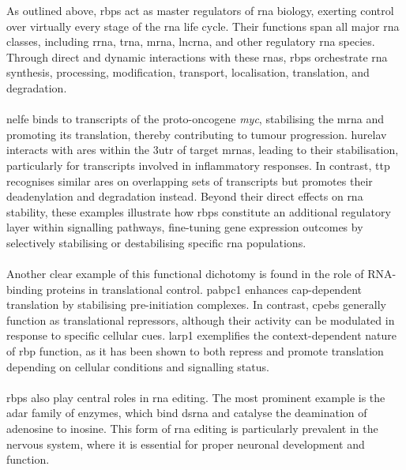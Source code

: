 As outlined above, \glspl{rbp} act as master regulators of \gls{rna} biology, exerting control over virtually every stage of the \gls{rna} life cycle. Their functions span all major \gls{rna} classes, including \gls{rrna}, \gls{trna}, \gls{mrna}, \gls{lncrna}, and other regulatory \gls{rna} species\cite{gerstberger_census_2014, kelaini_rna-binding_2021}. Through direct and dynamic interactions with these \glspl{rna}, \glspl{rbp} orchestrate \gls{rna} synthesis, processing, modification, transport, localisation, translation, and degradation\cite{gerstberger_census_2014, kelaini_rna-binding_2021}.  
\\
\\
\Gls{nelfe} binds to transcripts of the proto-oncogene \textit{\gls{myc}}, stabilising the \gls{mrna} and promoting its translation, thereby contributing to tumour progression\cite{kelaini_rna-binding_2021}. \gls{hurelav} interacts with \glspl{are} within the \gls{3utr} of target \glspl{mrna}, leading to their stabilisation, particularly for transcripts involved in inflammatory responses\cite{kelaini_rna-binding_2021}. In contrast, \gls{ttp} recognises similar \glspl{are} on overlapping sets of transcripts but promotes their deadenylation and degradation instead\cite{kelaini_rna-binding_2021}.
Beyond their direct effects on \gls{rna} stability, these examples illustrate how \glspl{rbp} constitute an additional regulatory layer within signalling pathways, fine-tuning gene expression outcomes by selectively stabilising or destabilising specific \gls{rna} populations.
\\
\\
Another clear example of this functional dichotomy is found in the role of RNA-binding proteins in translational control. \Gls{pabpc1} enhances cap-dependent translation by stabilising pre-initiation complexes\cite{harvey_trans-acting_2018}. In contrast, \glspl{cpeb} generally function as translational repressors, although their activity can be modulated in response to specific cellular cues\cite{harvey_trans-acting_2018}. \gls{larp1} exemplifies the context-dependent nature of \gls{rbp} function, as it has been shown to both repress and promote translation depending on cellular conditions and signalling status\cite{harvey_trans-acting_2018, burrows_rna_2010, fonseca_-related_2015}.
\\
\\
\glspl{rbp} also play central roles in \gls{rna} editing. The most prominent example is the \gls{adar} family of enzymes, which bind \gls{dsrna} and catalyse the deamination of adenosine to inosine\cite{savva_adar_2012}. This form of \gls{rna} editing is particularly prevalent in the nervous system, where it is essential for proper neuronal development and function\cite{savva_adar_2012}.
